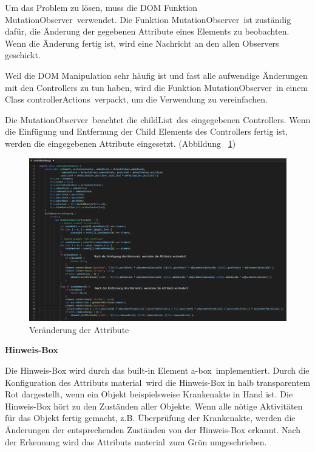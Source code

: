   Um das Problem zu lösen, muss die DOM Funktion \glqq MutationObserver\grqq\ verwendet. Die Funktion \glqq MutationObserver\grqq\ ist zuständig dafür, die Änderung der gegebenen Attribute eines Elements zu beobachten. Wenn die Änderung fertig ist, wird eine Nachricht an den allen Observers geschickt.
  
  Weil die DOM Manipulation sehr häufig ist und fast alle aufwendige Änderungen mit den Controllers zu tun haben, wird die Funktion \glqq MutationObserver\grqq\ in einem Class \glqq controllerActions\grqq\ verpackt, um die Verwendung zu vereinfachen.
  
  Die \glqq MutationObserver\grqq\ beachtet die \glqq childList\grqq\ des eingegebenen Controllers. Wenn die Einfügung und Entfernung der Child Elements des Controllers fertig ist, werden die eingegebenen Attribute eingesetzt. (Abbildung ~\ref{fig:controllerAction})
  
\begin{figure}[ht]
\vspace*{0.3cm}
\centering
\includegraphics[width=\textwidth]{images/controllerAction.png}
\caption[Veränderung der Attribute]{Veränderung der Attribute}
\label{fig:controllerAction} 
\end{figure}
  
  \textbf{Hinweis-Box}
  
  Die Hinweis-Box wird durch das built-in Element \glqq a-box\grqq\ implementiert. Durch die Konfiguration des Attributs \glqq material\grqq\ wird die Hinweis-Box in halb transparentem Rot dargestellt, wenn ein Objekt beispielsweise Krankenakte in Hand ist. Die Hinweis-Box hört zu den Zuständen aller Objekte. Wenn alle nötige Aktivitäten für das Objekt fertig gemacht, z.B. Überprüfung der Krankenakte, werden die Änderungen der entsprechenden Zuständen von der Hinweis-Box erkannt. Nach der Erkennung wird das Attributs \glqq material\grqq\ zum Grün umgeschrieben.
  
